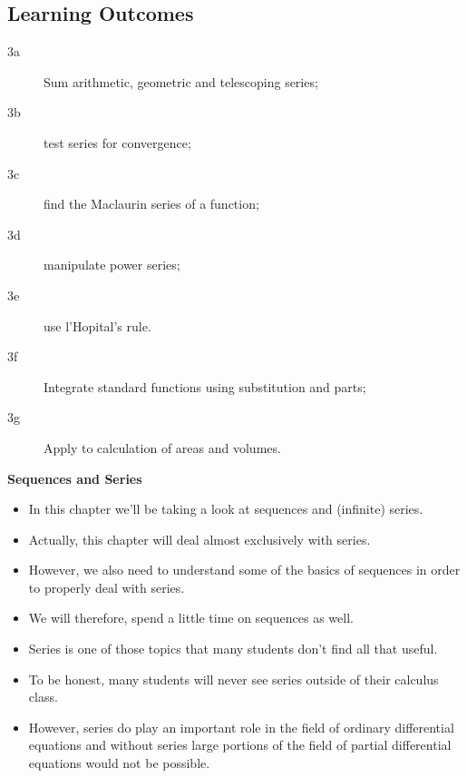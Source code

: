 \documentclass{article}
\begin{document}
	
	\subsection{Learning Outcomes}
		\begin{description}
			\item[3a] Sum arithmetic, geometric and telescoping series; 
			\item[3b] test series for convergence; 
			\item[3c] find the Maclaurin series of a function; 
			\item[3d] manipulate power series; 
			\item[3e] use l'Hopital's rule. 
			\item[3f] Integrate standard functions using substitution and parts; 
			\item[3g] Apply to calculation of areas and volumes. 
		\end{description}
	
	

	
	\textbf{Sequences and Series}\\
	\begin{itemize}
\item In this chapter we’ll be taking a look at sequences and (infinite) series. 
\item Actually, this chapter will deal almost exclusively with series. 
\item However, we also need to understand some of the basics of sequences in order to properly deal with series.  
\item We will therefore, spend a little time on sequences as well.
\end{itemize}


	
	\begin{itemize}
		\item  Series is one of those topics that many students don’t find all that useful. \item To be honest, many students will never see series outside of their calculus class. \item However, series do play an important role in the field of ordinary differential equations and without series large portions of the field of partial differential equations would not be possible.
\end{itemize}
\end{document}
